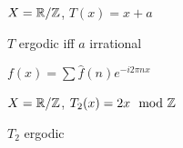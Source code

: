 \begin{setting}
    $X = \mathbb{R}/\mathbb{Z}$, $T(x) = x + a$
\end{setting}

\begin{prop}
    $T$ ergodic iff $a$ irrational
\end{prop}

\begin{fact}
    $f(x) = \sum \widehat{f}(n) e^{-i2\pi nx}$
\end{fact}

\begin{setting}
    $X = \mathbb{R}/\mathbb{Z}$, $T_2(x) = 2x \mod {\mathbb{Z}}$
\end{setting}

\begin{prop}
    $T_2$ ergodic
\end{prop}

